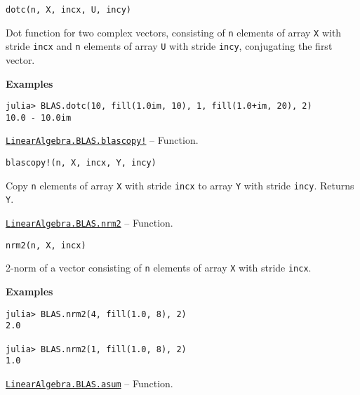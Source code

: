 \begin{adjustwidth}{2em}{0pt}


\begin{verbatim}
dotc(n, X, incx, U, incy)
\end{verbatim}

Dot function for two complex vectors, consisting of \texttt{n} elements of array \texttt{X} with stride \texttt{incx} and \texttt{n} elements of array \texttt{U} with stride \texttt{incy}, conjugating the first vector.

\textbf{Examples}


\begin{verbatim}
julia> BLAS.dotc(10, fill(1.0im, 10), 1, fill(1.0+im, 20), 2)
10.0 - 10.0im
\end{verbatim}



\end{adjustwidth}
\hypertarget{18067085143510999712}{} 
\hyperlink{18067085143510999712}{\texttt{LinearAlgebra.BLAS.blascopy!}}  -- {Function.}

\begin{adjustwidth}{2em}{0pt}


\begin{verbatim}
blascopy!(n, X, incx, Y, incy)
\end{verbatim}

Copy \texttt{n} elements of array \texttt{X} with stride \texttt{incx} to array \texttt{Y} with stride \texttt{incy}. Returns \texttt{Y}.



\end{adjustwidth}
\hypertarget{16054338457942758080}{} 
\hyperlink{16054338457942758080}{\texttt{LinearAlgebra.BLAS.nrm2}}  -- {Function.}

\begin{adjustwidth}{2em}{0pt}


\begin{verbatim}
nrm2(n, X, incx)
\end{verbatim}

2-norm of a vector consisting of \texttt{n} elements of array \texttt{X} with stride \texttt{incx}.

\textbf{Examples}


\begin{verbatim}
julia> BLAS.nrm2(4, fill(1.0, 8), 2)
2.0

julia> BLAS.nrm2(1, fill(1.0, 8), 2)
1.0
\end{verbatim}



\end{adjustwidth}
\hypertarget{17921796148467908168}{} 
\hyperlink{17921796148467908168}{\texttt{LinearAlgebra.BLAS.asum}}  -- {Function.}

